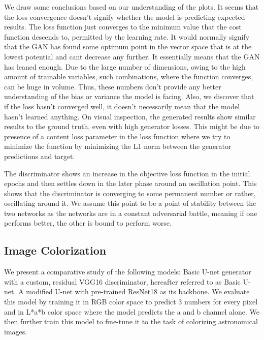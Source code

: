 \documentclass[oneside,a4paper,12pt]{report}
\begin{document}
We draw some conclusions based on our understanding of the plots. It seems that the loss convergence doesn't signify whether the model is predicting expected results. The loss function just converges to the minimum value that the cost function descends to, permitted by the learning rate. It would normally signify that the GAN has found some optimum point in the vector space that is at the lowest potential and cant decrease any further. It essentially means that the GAN has leaned enough. Due to the large number of dimensions, owing to the high amount of trainable variables, such combinations, where the function converges, can be huge in volume. Thus, these numbers don't provide any better understanding of the bias or variance the model is facing. Also, we discover that if the loss hasn't converged well, it doesn't necessarily mean that the model hasn't learned anything. On visual inspection, the generated results show similar results to the ground truth, even with high generator losses. This might be due to presence of a content loss parameter in the loss function where we try to minimize the function by  minimizing the L1 norm between the generator predictions and target.

The discriminator shows an increase in the objective loss function in the initial epochs and then settles down in the later phase around an oscillation point. This shows that the discriminator is converging to some permanent number or rather, oscillating around it. We assume this point to be a point of stability between the two networks as the networks are in a constant adversarial battle, meaning if one performs better, the other is bound to perform worse.
\pagebreak
\subsection{Image Colorization}
\hspace*{0.25 in}We present a comparative study of the following models: Basic U-net generator with a custom, residual VGG16 discriminator, hereafter referred to as Basic U-net. A modified U-net with pre-trained ResNet18 as its backbone. We evaluate this model by training it in RGB color space to predict 3 numbers for every pixel and in L*a*b color space where the model predicts the a and b channel alone. We then further train this model to fine-tune it to the task of colorizing astronomical images.
\end{document}
